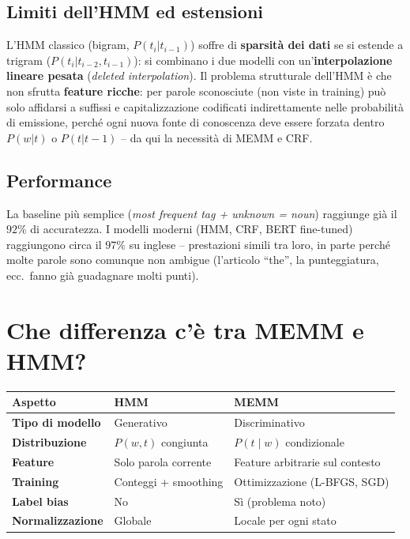 \documentclass[12pt,a4paper]{article}
\begin{document}
\subsection{Limiti dell'HMM ed estensioni}

L'HMM classico (bigram, $P(t_i|t_{i-1})$) soffre di \textbf{sparsità dei dati} se si estende a trigram ($P(t_i|t_{i-2},t_{i-1})$): si combinano i due modelli con un'\textbf{interpolazione lineare pesata} (\emph{deleted interpolation}). Il problema strutturale dell'HMM è che non sfrutta \textbf{feature ricche}: per parole sconosciute (non viste in training) può solo affidarsi a suffissi e capitalizzazione codificati indirettamente nelle probabilità di emissione, perché ogni nuova fonte di conoscenza deve essere forzata dentro $P(w|t)$ o $P(t|t-1)$ -- da qui la necessità di MEMM e CRF.

\subsection{Performance}

La baseline più semplice (\emph{most frequent tag + unknown = noun}) raggiunge già il $92\%$ di accuratezza. I modelli moderni (HMM, CRF, BERT fine-tuned) raggiungono circa il $97\%$ su inglese -- prestazioni simili tra loro, in parte perché molte parole sono comunque non ambigue (l'articolo ``the'', la punteggiatura, ecc.\ fanno già guadagnare molti punti).

\section{Che differenza c'è tra MEMM e HMM?}

\begin{center}
\begin{tabular}{>{\bfseries}lll}
\toprule
Aspetto & HMM & MEMM \\
\midrule
Tipo di modello & Generativo & Discriminativo \\
Distribuzione & $P(w,t)$ congiunta & $P(t \mid w)$ condizionale \\
Feature & Solo parola corrente & Feature arbitrarie sul contesto \\
Training & Conteggi + smoothing & Ottimizzazione (L-BFGS, SGD) \\
Label bias & No & Sì (problema noto) \\
Normalizzazione & Globale & Locale per ogni stato \\
\bottomrule
\end{tabular}
\end{center}
\end{document}
